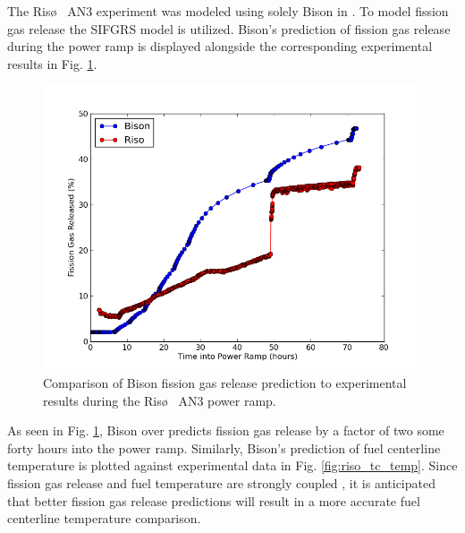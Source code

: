 The Ris\o~ AN3 experiment was modeled using solely Bison in \cite{Perez}. To model fission gas release the \ac{SIFGRS} model is utilized. Bison's prediction of fission gas release during the power ramp is displayed alongside the corresponding experimental results in Fig. \ref{fig:riso_fgr}.  
\begin{figure}
\caption{\label{fig:riso_fgr}
Comparison of Bison fission gas release prediction to experimental results during the Ris\o~ AN3 power ramp.}
 \begin{center}
  \includegraphics[scale=.75]{./Ongoing_Work/fgr_comparison.png}
 \end{center}
\end{figure} 
As seen in Fig. \ref{fig:riso_fgr}, Bison over predicts fission gas release by a factor of two some forty hours into the power ramp. Similarly, Bison's prediction of fuel centerline temperature is plotted against experimental data in Fig. \ref{fig:riso_tc_temp}. Since fission gas release and fuel temperature are strongly coupled \cite{Perez}, it is anticipated that better fission gas release predictions will result in a more accurate fuel centerline temperature comparison. 

